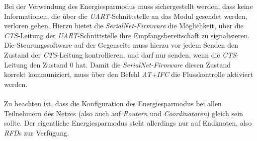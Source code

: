         Bei der Verwendung des Energiesparmodus muss sichergestellt werden, dass keine Informationen,
        die über die \emph{UART}-Schnittstelle an das Modul gesendet werden, verloren gehen. Hierzu 
        bietet die \emph{SerialNet-Firmware} die Möglichkeit, über die \emph{CTS}-Leitung der 
        \emph{UART}-Schnittstelle ihre Empfangsbereitschaft zu signalisieren. Die Steurungssoftware
        auf der Gegenseite muss hierzu vor jedem Senden den Zustand der \emph{CTS}-Leitung
        kontrollieren, und darf nur senden, wenn die \emph{CTS}-Leitung den Zustand 0 hat. Damit die
        \emph{SerialNet-Firmware} diesen Zustand korrekt kommuniziert, muss über den Befehl \emph{AT+IFC}
        die Flusskontrolle aktiviert werden. \\
        \\
        Zu beachten ist, dass die Konfiguration des Energiesparmodus bei allen Teilnehmern des Netzes
        (also auch auf \emph{Routern} und \emph{Coordinatoren}) gleich sein sollte. Der eigentliche Energiesparmodus steht
        allerdings nur auf Endknoten, also \emph{RFD}s zur Verfügung.
